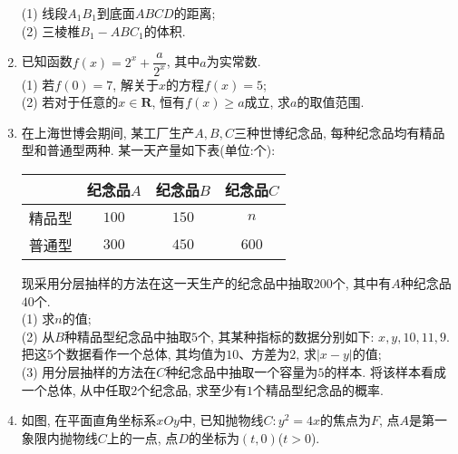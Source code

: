 \documentclass[10pt,a4paper]{article}
\begin{document}
\begin{enumerate}[1.]
\begin{center}
\end{center}
(1) 线段$A_1B_1$到底面$ABCD$的距离;\\
(2) 三棱椎$B_1-ABC_1$的体积.
\item 已知函数$f(x)=2^x+\dfrac a{2^x}$, 其中$a$为实常数.\\
(1) 若$f(0)=7$, 解关于$x$的方程$f(x)=5$;\\
(2) 若对于任意的$x\in \mathbf{R}$, 恒有$f(x)\ge a$成立, 求$a$的取值范围.
\item 在上海世博会期间, 某工厂生产$A,B,C$三种世博纪念品, 每种纪念品均有精品型和普通型两种. 某一天产量如下表(单位:个):
\begin{center}
\begin{tabular}{|c|c|c|c|}
\hline
    & 纪念品$A$ & 纪念品$B$ & 纪念品$C$ \\ \hline
精品型 & $100$ & $150$ & $n$ \\ \hline
普通型 & $300$ & $450$ & $600$ \\ \hline
\end{tabular}
\end{center}
现采用分层抽样的方法在这一天生产的纪念品中抽取$200$个, 其中有$A$种纪念品$40$个.\\
(1)	求$n$的值;\\
(2)	从$B$种精品型纪念品中抽取$5$个, 其某种指标的数据分别如下: $x,y,10,11,9$. 把这$5$个数据看作一个总体, 其均值为$10$、方差为$2$, 求$|x-y|$的值;\\
(3)	用分层抽样的方法在$C$种纪念品中抽取一个容量为$5$的样本. 将该样本看成一个总体, 从中任取$2$个纪念品, 求至少有$1$个精品型纪念品的概率.
\item 如图, 在平面直角坐标系$xOy$中, 已知抛物线$C:y^2=4x$的焦点为$F$, 点$A$是第一象限内抛物线$C$上的一点, 点$D$的坐标为$(t,0)$($t>0$).
\begin{center}
\end{center}
\end{enumerate}
\end{document}

